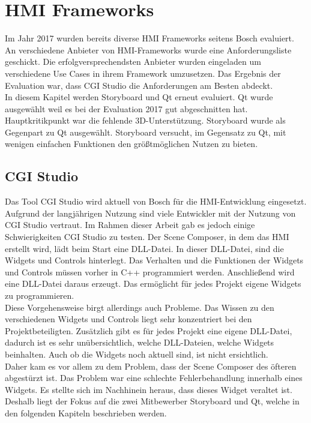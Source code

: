 \section{HMI Frameworks}
\label{hauptabschnitt_4}

Im Jahr 2017 wurden bereits diverse HMI Frameworks seitens Bosch evaluiert. An verschiedene Anbieter von \ac{HMI}-Frameworks wurde eine Anforderungsliste geschickt. Die erfolgversprechendsten Anbieter wurden eingeladen um verschiedene Use Cases in ihrem Framework umzusetzen. Das Ergebnis der Evaluation war, dass CGI Studio die Anforderungen am Besten abdeckt.\\

In diesem Kapitel werden Storyboard und Qt erneut evaluiert. Qt wurde ausgewählt weil es bei der Evaluation 2017 gut abgeschnitten hat. Hauptkritikpunkt war die fehlende 3D-Unterstützung. Storyboard wurde als Gegenpart zu Qt ausgewählt. Storyboard versucht, im Gegensatz zu Qt, mit wenigen einfachen Funktionen den größtmöglichen Nutzen zu bieten. \\ 

\subsection{CGI Studio}
\label{cgi}
Das Tool CGI Studio wird aktuell von Bosch für die \ac{HMI}-Entwicklung eingesetzt. Aufgrund der langjährigen Nutzung sind viele Entwickler mit der Nutzung von CGI Studio vertraut. Im Rahmen dieser Arbeit gab es jedoch einige Schwierigkeiten CGI Studio zu testen. Der Scene Composer, in dem das HMI erstellt wird, lädt beim Start eine DLL-Datei. In dieser DLL-Datei, sind die Widgets und Controls hinterlegt. Das Verhalten und die Funktionen der Widgets und Controls müssen vorher in C++ programmiert werden. Anschließend wird eine DLL-Datei daraus erzeugt. Das ermöglicht für jedes Projekt eigene Widgets zu programmieren.\\

Diese Vorgehensweise birgt allerdings auch Probleme. Das Wissen zu den verschiedenen Widgets und Controls liegt sehr konzentriert bei den Projektbeteiligten. Zusätzlich gibt es für jedes Projekt eine eigene DLL-Datei, dadurch ist es sehr unübersichtlich, welche DLL-Dateien, welche Widgets beinhalten. Auch ob die Widgets noch aktuell sind, ist nicht ersichtlich.\\

Daher kam es vor allem zu dem Problem, dass der Scene Composer des öfteren abgestürzt ist. Das Problem war eine schlechte Fehlerbehandlung innerhalb eines Widgets. Es stellte sich im Nachhinein heraus, dass dieses Widget veraltet ist. Deshalb liegt der Fokus auf die zwei Mitbewerber Storyboard und Qt, welche in den folgenden Kapiteln beschrieben werden.\\ 


